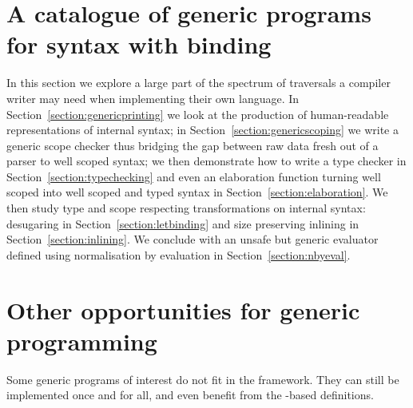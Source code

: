 \begin{center}
\end{center}



\section{A catalogue of generic programs for syntax with binding}
\label{section:catalogue}

In this section we explore a large part of the spectrum of traversals a
compiler writer may need when implementing their own language.
In Section~\ref{section:genericprinting} we look at the production of
human-readable representations of internal syntax; in Section~\ref{section:genericscoping}
we write a generic scope checker thus bridging the gap between raw data
fresh out of a parser to well scoped syntax; we then demonstrate how to
write a type checker in Section~\ref{section:typechecking} and even an
elaboration function turning well scoped into well scoped and typed syntax
in Section~\ref{section:elaboration}. We then study type and scope respecting
transformations on internal syntax: desugaring in Section~\ref{section:letbinding}
and size preserving inlining in Section~\ref{section:inlining}. We conclude
with an unsafe but generic evaluator defined using normalisation by evaluation
in Section~\ref{section:nbyeval}.










\section{Other opportunities for generic programming}

Some generic programs of interest do not fit in the 
framework. They can still be implemented once and for all, and even
benefit from the -based definitions.

